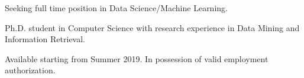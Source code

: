 


\begin{cvpapers}

\item \cvpaper
{Seeking full time position in Data Science/Machine Learning.}
\vspace{-1.5mm}
\item \cvpaper
{Ph.D. student in Computer Science with research experience in Data Mining and Information Retrieval.}
\vspace{-1.5mm}
\item \cvpaper
{Available starting from Summer 2019. In possession of valid employment authorization.}

\end{cvpapers}
